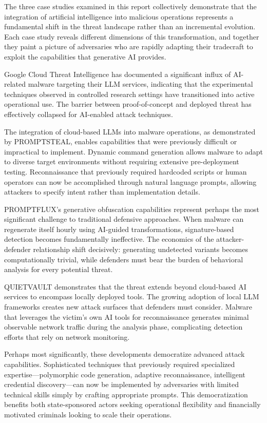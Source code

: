 \documentclass[12pt,a4paper]{article}
\begin{document}
The three case studies examined in this report collectively demonstrate that the integration of artificial intelligence into malicious operations represents a fundamental shift in the threat landscape rather than an incremental evolution. Each case study reveals different dimensions of this transformation, and together they paint a picture of adversaries who are rapidly adapting their tradecraft to exploit the capabilities that generative AI provides.

Google Cloud Threat Intelligence has documented a significant influx of AI-related malware targeting their LLM services, indicating that the experimental techniques observed in controlled research settings have transitioned into active operational use. The barrier between proof-of-concept and deployed threat has effectively collapsed for AI-enabled attack techniques.

The integration of cloud-based LLMs into malware operations, as demonstrated by PROMPTSTEAL, enables capabilities that were previously difficult or impractical to implement. Dynamic command generation allows malware to adapt to diverse target environments without requiring extensive pre-deployment testing. Reconnaissance that previously required hardcoded scripts or human operators can now be accomplished through natural language prompts, allowing attackers to specify intent rather than implementation details.

PROMPTFLUX's generative obfuscation capabilities represent perhaps the most significant challenge to traditional defensive approaches. When malware can regenerate itself hourly using AI-guided transformations, signature-based detection becomes fundamentally ineffective. The economics of the attacker-defender relationship shift decisively: generating undetected variants becomes computationally trivial, while defenders must bear the burden of behavioral analysis for every potential threat.

QUIETVAULT demonstrates that the threat extends beyond cloud-based AI services to encompass locally deployed tools. The growing adoption of local LLM frameworks creates new attack surfaces that defenders must consider. Malware that leverages the victim's own AI tools for reconnaissance generates minimal observable network traffic during the analysis phase, complicating detection efforts that rely on network monitoring.

Perhaps most significantly, these developments democratize advanced attack capabilities. Sophisticated techniques that previously required specialized expertise—polymorphic code generation, adaptive reconnaissance, intelligent credential discovery—can now be implemented by adversaries with limited technical skills simply by crafting appropriate prompts. This democratization benefits both state-sponsored actors seeking operational flexibility and financially motivated criminals looking to scale their operations.
\end{document}
